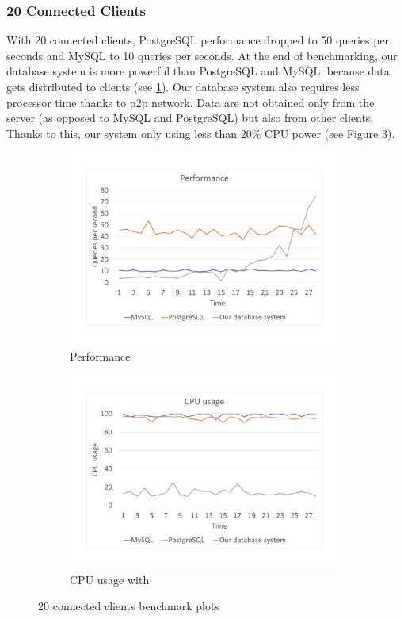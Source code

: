 \subsubsection*{20 Connected Clients}
With 20 connected clients, PostgreSQL performance dropped to 50 queries per seconds and MySQL to 10 queries per seconds. At the end of benchmarking, our database system is more powerful than PostgreSQL and MySQL, because data gets distributed to clients (see \ref{bench20per}). Our database system also requires less processor time thanks to p2p network. Data are not obtained only from the server (as opposed to MySQL and PostgreSQL) but also from other clients. Thanks to this, our system only using less than 20\% CPU power (see Figure \ref{bench20cpu}).

\begin{figure}[h]
    \begin{subfigure}{.5\textwidth}
        \centering
        \includegraphics[trim={1.78cm 2cm 2.08cm 1cm},clip,width=1.0\linewidth]{excel/20per.pdf}
        \caption{Performance}
        \label{bench20per}
    \end{subfigure}
    \begin{subfigure}{.5\textwidth}
        \centering
        \includegraphics[trim={1.78cm 2cm 2.08cm 1cm},clip,width=1.0\linewidth]{excel/20cpu.pdf}
        \caption{CPU usage with}
        \label{bench20cpu}
    \end{subfigure}
    \caption{20 connected clients benchmark plots}
\end{figure}



